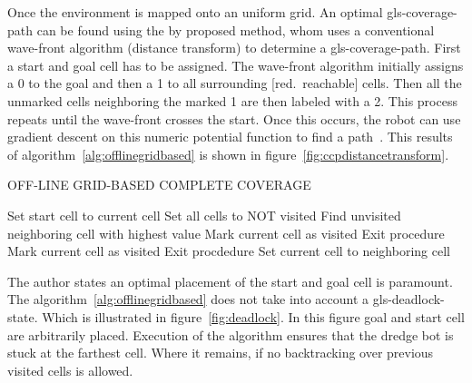 Once the environment is mapped onto an uniform grid. An optimal \gls{gls-coverage-path} can be found using the by
\citet{zelinsky_coverage_1998} proposed method, whom uses a conventional wave-front algorithm (distance transform) to
determine a \gls{gls-coverage-path}. First a start and goal cell has to be assigned. The wave-front algorithm initially
assigns a 0 to the goal and then a 1 to all surrounding [red.~reachable] cells. Then all the unmarked cells neighboring
the marked 1 are then labeled with a 2. This process repeats until the wave-front crosses the start. Once this occurs,
the robot can use gradient descent on this numeric potential function to find a path~\cite{choset_coverage_2001}. This
results of algorithm~\ref{alg:offlinegridbased} is shown in figure~\ref{fig:ccpdistancetransform}.

\begin{RoyalAlgorithm}[label=alg:offlinegridbased]{OFF-LINE GRID-BASED COMPLETE COVERAGE}
    \begin{algorithmic}[1]
            \State Set start cell to current cell
            \State Set all cells to NOT visited
            \Loop
                \State Find unvisited neighboring cell with highest value
                    \State Mark current cell as visited
                    \State Exit procedure 
                \EndIf
                    \State Mark current cell as visited
                    \State Exit procdedure 
                \EndIf
                \State Set current cell to neighboring cell 
            \EndLoop
        \EndProcedure
    \end{algorithmic}
\end{RoyalAlgorithm}

The author states an optimal placement of the start and goal cell is paramount. The algorithm~\ref{alg:offlinegridbased}
does not take into account a \gls{gls-deadlock-state}. Which is illustrated in figure~\ref{fig:deadlock}. In this figure
goal and start cell are arbitrarily placed. Execution of the algorithm ensures that the dredge bot is stuck at the
farthest cell. Where it remains, if no backtracking over previous visited cells is allowed.

